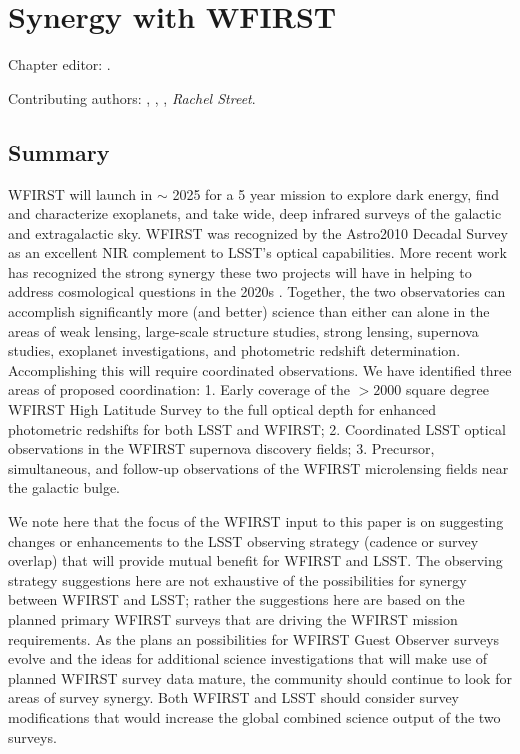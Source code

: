 \chapter[Synergy with WFIRST]{Synergy with WFIRST}
\def\chpname{wfirst}\label{chp:\chpname}

Chapter editor:
.

Contributing authors:
,
,
,
{\it Rachel Street}.

\section*{Summary}

WFIRST will launch in $\sim$ 2025 for a 5 year mission to explore dark energy, find and characterize exoplanets, and take wide, deep infrared surveys of the galactic and extragalactic sky.  WFIRST was recognized by the Astro2010 Decadal Survey as an excellent NIR complement to LSST's optical capabilities. More recent work has recognized the strong synergy these two projects will have in helping to address cosmological questions in the 2020s \citep{2015arXiv150107897J}.
  Together, the two observatories can accomplish significantly more (and better) science than either can alone in the areas of weak lensing, large-scale structure studies, strong lensing, supernova studies, exoplanet investigations,  and photometric redshift determination. Accomplishing this will require coordinated observations.  We have identified three areas of proposed coordination: 1. Early coverage of the $>2000$ square degree WFIRST High Latitude Survey to the full optical depth for enhanced photometric redshifts for both LSST and WFIRST; 2. Coordinated LSST optical observations in the WFIRST supernova discovery fields; 3. Precursor, simultaneous, and follow-up observations of the WFIRST microlensing fields near the galactic bulge.

  We note here that the focus of the WFIRST  input to this paper is on suggesting changes or enhancements to the LSST observing strategy (cadence or survey overlap) that will provide mutual benefit for WFIRST and LSST.  The observing strategy suggestions here are not exhaustive of the possibilities for synergy between WFIRST and LSST; rather the suggestions here are based on the planned primary WFIRST surveys that are driving the WFIRST mission requirements.  As the plans an possibilities for WFIRST Guest Observer surveys evolve and the ideas for additional science investigations that will make use of planned WFIRST survey data mature, the community should continue to look for areas of survey synergy.  Both WFIRST and LSST should consider survey modifications that would increase the global combined science output of the two surveys.



